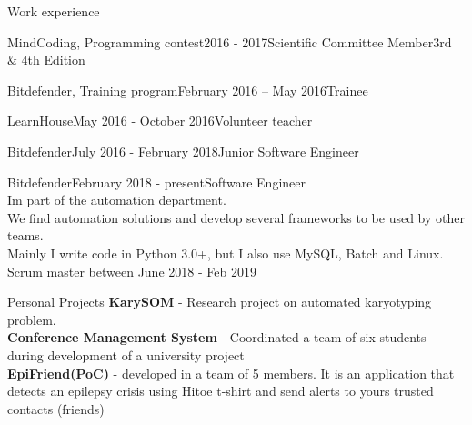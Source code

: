 \documentclass{resume} %
\begin{document}
\begin{rSection}{Work experience}

    \begin{rSubsection}{MindCoding, Programming contest}{2016 - 2017}{Scientific Committee Member}{3rd \& 4th Edition}
    \end{rSubsection}
    \begin{rSubsection}{Bitdefender, Training program}{February 2016 – May 2016}{Trainee}{}
    \end{rSubsection}
    \begin{rSubsection}{LearnHouse}{May 2016 - October 2016}{Volunteer teacher}{}
    \end{rSubsection}
    \begin{rSubsection}{Bitdefender}{July 2016 - February 2018}{Junior Software Engineer}{}
    \end{rSubsection}
    \begin{rSubsection}{Bitdefender}{February 2018 - present}{Software Engineer}{\\I\textquotesingle m part of the automation department. \\We find automation solutions and develop several frameworks to be used by other teams. \\Mainly I write code in Python 3.0+, but I also use MySQL, Batch and Linux. \\ Scrum master between June 2018 - Feb 2019}
    \end{rSubsection}

\end{rSection}
\begin{rSection}{Personal Projects}
{\bf KarySOM} - Research project on automated karyotyping problem.\\
{\bf Conference Management System} - Coordinated a team of six students during development of a university project\\
{\bf EpiFriend(PoC)} - developed in a team of 5 members. It is an application that detects an epilepsy crisis using Hitoe t-shirt and send alerts to yours trusted contacts (friends)

\end{rSection}
\end{document}

